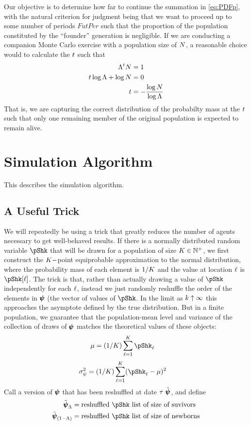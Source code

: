 \documentclass[\econtexRoot/BufferStockTheory.tex]{subfiles}
\begin{document}
Our objective is to determine how far to continue the summation in \eqref{eq:PDFp}, with the natural criterion for judgment being that we want to proceed up to some number of periods $FutPer$ such that the proportion of the population constituted by the ``founder'' generation is negligible.
If we are conducting a companion Monte Carlo exercise with a population size of $N$, a reasonable choice would to calculate the $t$ such that
\begin{align*}
  \Lambda^{t}N & = 1 
  \\  t \log \Lambda + \log N & = 0
  \\  t  & = - \frac{\log N}{\log \Lambda}  \label{eq:lessThanOneLeft}
\end{align*}
That is, we are capturing the correct distribution of the probabilty mass at the $t$ such that only one remaining member of the original population is expected to remain alive.
\section{Simulation Algorithm}
This describes the simulation algorithm.
\subsection{A Useful Trick}
We will repeatedly be using a trick that greatly reduces the number of agents necessary to get well-behaved results.  If there is a normally distributed random variable $\pShk$ that will be drawn for a population of size $K \in \mathbb{N}^{+}$, we first construct the $K-$point equiprobable approximation to the normal distribution, where the probability mass of each element is $1/K$ and the value at location $\ell$ is $\pShk[\posn]$.
The trick is that, rather than actually drawing a value of $\pShk$ independently for each $\ell$, instead we just randomly reshuffle the order of the elements in $\pmb{\psi}$ (the vector of values of $\pShk$.  In the limit as $k \uparrow \infty$ this approaches the asymptote defined by the true distribution.  But in a finite population, we guarantee that the population-mean level and variance of the collection of draws of $\pmb{\psi}$ matches the theoretical values of these objects:
\begin{align}
  \mu & = (1/\Mass)\sum_{\posn=1}^{\Mass}\pShk_{\posn}
\end{align}
\begin{align}
  \sigma^{2}_{\DnsShk} & = (1/\Mass)\sum_{\posn=1}^{\Mass}(\pShk_{\posn} - \mu)^{2}
\end{align}
Call a version of $\pmb{\psi}$ that has been reshuffled at date $\tau$ $\tilde{\pmb{\psi}}$, and define
\newcommand{\pShkOldRemix}{\tilde{\vctr{\DnsShk}}_{\Liv}}
\newcommand{\pShkNewRemix}{\tilde{\vctr{\DnsShk}}_{\Die}}
\begin{align}
  \pShkOldRemix & = \text{reshuffled $\pShk$ list of size of suvivors} 
  \\  \pShkNewRemix & = \text{reshuffled $\pShk$ list of size of newborns}
\end{align}
\end{document}
